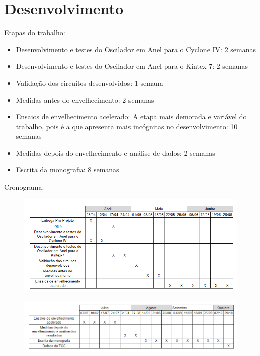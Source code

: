 \chapter{Desenvolvimento}
Etapas do trabalho:
\begin{itemize}
    \item Desenvolvimento e testes do Oscilador em Anel para o Cyclone IV: 2 semanas
    \item Desenvolvimento e testes do Oscilador em Anel para o Kintex-7: 2 semanas
    \item Validação dos circuitos desenvolvidos: 1 semana
    \item Medidas antes do envelhecimento: 2 semanas
    \item Ensaios de envelhecimento acelerado: A etapa mais demorada e variável do trabalho, pois é a que apresenta mais incógnitas no desenvolvimento: 10 semanas
    \item Medidas depois do envelhecimento e análise de dados: 2 semanas
    \item Escrita da monografia: 8 semanas
\end{itemize}

Cronograma:
\begin{figure}[H]
    \centering
    \includegraphics[width=\linewidth]{figures/Cornograma 1.png}
    \label{fig:Cornograma1}
\end{figure}

\begin{figure}[H]
    \centering
    \includegraphics[width=\linewidth]{figures/Cornograma 2.png}
    \label{fig:Cornograma2}
\end{figure}
